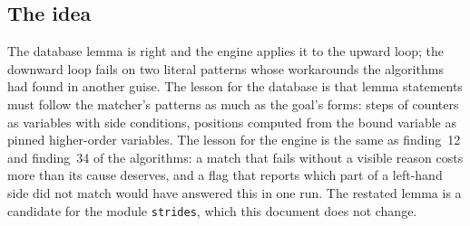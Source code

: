 \subsection{The idea}
The database lemma is right and the engine applies it to the upward loop; the downward loop fails on two
literal patterns whose workarounds the algorithms had found in another guise. The lesson for the database is
that lemma statements must follow the matcher's patterns as much as the goal's forms: steps of counters as
variables with side conditions, positions computed from the bound variable as pinned higher-order
variables. The lesson for the engine is the same as finding~12 and finding~34 of the algorithms: a match that
fails without a visible reason costs more than its cause deserves, and a flag that reports which part of a
left-hand side did not match would have answered this in one run. The restated lemma is a candidate for the
module \texttt{strides}, which this document does not change.
